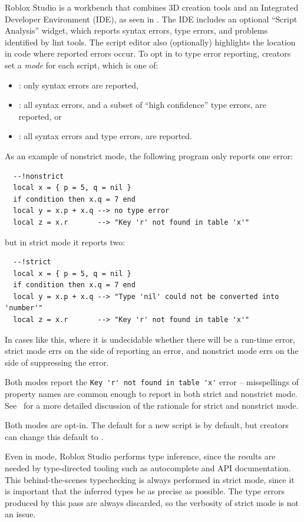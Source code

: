 \documentclass[english,submission,cleveref]{programming}
\begin{document}
{Roblox Studio} is a workbench that
combines {3D creation} tools and an Integrated
Developer Environment (IDE), as seen in .
The IDE includes an optional ``Script Analysis'' widget, which
reports syntax errors, type errors, and problems identified by
lint tools. The script editor also (optionally) highlights
the location in code where reported errors occur.
To opt in to type error reporting, creators set a \emph{mode}
for each script, which is one of:
\begin{itemize}
  \item \mnocheck{}: only syntax errors are reported,
  \item \mnonstrict{}: all syntax errors, and a subset of ``high confidence'' type errors, are reported, or
  \item \mstrict{}: all syntax errors and type errors, are reported.
\end{itemize}
As an example of nonstrict mode, the following program only reports one error:
\begin{verbatim}
  --!nonstrict
  local x = { p = 5, q = nil }
  if condition then x.q = 7 end
  local y = x.p + x.q --> no type error
  local z = x.r       --> "Key 'r' not found in table 'x'"
\end{verbatim}
but in strict mode it reports two:
\begin{verbatim}
  --!strict
  local x = { p = 5, q = nil }
  if condition then x.q = 7 end
  local y = x.p + x.q --> "Type 'nil' could not be converted into 'number'"
  local z = x.r       --> "Key 'r' not found in table 'x'"
\end{verbatim}
In cases like this, where it is undecidable whether there will be a run-time error,
strict mode errs on the side of reporting an error, and nonstrict mode errs on
the side of suppressing the error.

Both modes report the \verb|Key 'r' not found in table 'x'| error --
misspellings of property names are common enough to report in both
strict and nonstrict mode. See~\cite{bfj-hatra-2021}
for a more detailed discussion of the rationale for strict and nonstrict mode.

Both modes are opt-in. The default for a new script is \mnocheck{} by
default, but creators can change this default to \mnonstrict{}.

Even in \mnocheck{} mode, {Roblox Studio} performs type inference, since
the results are needed by type-directed tooling such as autocomplete and
API documentation. This behind-the-scenes typechecking is always performed
in strict mode, since it is important that the inferred types be as precise
as possible. The type errors produced by this pass are always discarded,
so the verbosity of strict mode is not an issue.
\end{document}
